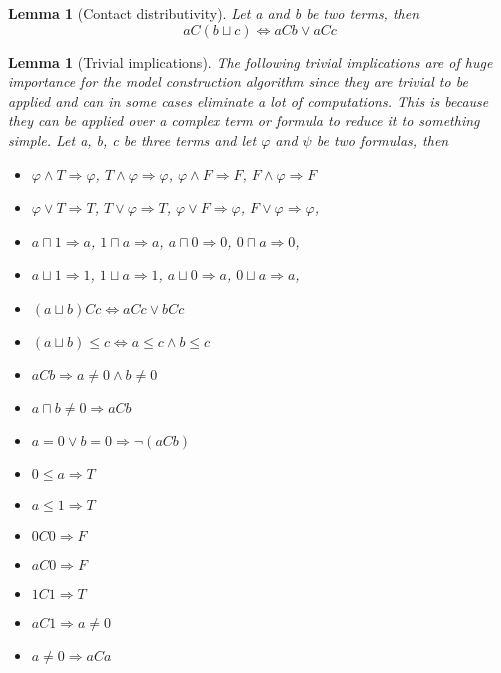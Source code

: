 \documentclass{article}
\newtheorem{lemma}[theorem]{Lemma}
\begin{document}
\begin{lemma}[Contact distributivity]
	Let a and b be two terms, then
	\begin{equation*}
		aC(b \sqcup c) \iff aCb \lor aCc
	\end{equation*}
\end{lemma}

\begin{lemma}[Trivial implications] The following trivial implications are of huge importance for the model construction algorithm since they are trivial to be applied and can in some cases eliminate a lot of computations. This is because they can be applied over a complex term or formula to reduce it to something simple.
\newline
	Let a, b, c be three terms and let $\varphi$ and $\psi$ be two formulas, then
	\begin{itemize}
		\item $\varphi \land T \Longrightarrow \varphi$,\;\; $T \land \varphi \Longrightarrow \varphi$,\;\;
		      $\varphi \land F \Longrightarrow F$,\;\; $F \land \varphi \Longrightarrow F$
		\item $\varphi \lor T \Longrightarrow T$,\;\; $T \lor \varphi \Longrightarrow T$,\;\;
		      $\varphi \lor F \Longrightarrow \varphi$,\;\; $F \lor \varphi \Longrightarrow \varphi$,
		\item $a \sqcap 1 \Longrightarrow a$,\;\; $1 \sqcap a \Longrightarrow a$,\;\;
		      $a \sqcap 0 \Longrightarrow 0$,\;\; $0 \sqcap a \Longrightarrow 0$,
		\item $a \sqcup 1 \Longrightarrow 1$,\;\; $1 \sqcup a \Longrightarrow 1$,\;\;
		      $a \sqcup 0 \Longrightarrow a$,\;\; $0 \sqcup a \Longrightarrow a$,
		\item $(a \sqcup b)Cc \iff aCc \lor bCc$
		\item $(a \sqcup b) \leq c \iff a \leq c \land b \leq c$
		\item $aCb \Longrightarrow a \neq 0 \land b \neq 0$
		\item $a \sqcap b \neq 0 \Longrightarrow aCb$
		\item $a = 0 \lor b = 0 \Longrightarrow \neg(aCb)$
		\item $0 \leq a \Longrightarrow T$
		\item $a \leq 1 \Longrightarrow T$
		\item $0C0 \Longrightarrow F$
		\item $aC0 \Longrightarrow F$
		\item $1C1 \Longrightarrow T$
		\item $aC1 \Longrightarrow a \neq 0$
		\item $a \neq 0 \Longrightarrow aCa$
	\end{itemize}
\end{lemma}
\end{document}
